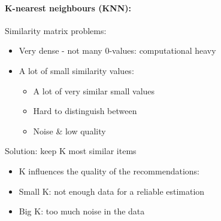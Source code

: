 \documentclass[12pt]{article}
\begin{document}
\paragraph{K-nearest neighbours (KNN):}
Similarity matrix problems:\begin{itemize}
    \item Very dense - not many 0-values: computational heavy
    \item A lot of small similarity values:\begin{itemize}
        \item A lot of very similar small values 
        \item Hard to distinguish between
        \item Noise \& low quality
    \end{itemize}
\end{itemize}
Solution: keep K most similar items\begin{itemize}
    \item K influences the quality of the recommendations:
    \item Small K: not enough data for a reliable estimation
    \item Big K: too much noise in the data
\end{itemize}
\end{document}
